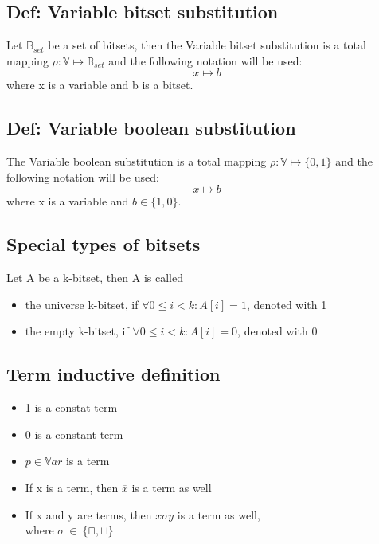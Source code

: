 \documentclass{article}
\begin{document}
	\subsection*{Def: Variable bitset substitution}
		Let $\mathbb{B}_{set}$ be a set of bitsets, then the Variable bitset substitution is a total mapping 
		 $\rho : \mathbb{V} \longmapsto \mathbb{B}_{set}$ and the following notation will be used:
		\begin{equation}
			x \longmapsto b
		\end{equation}
		where x is a variable and b is a bitset.
	\subsection*{Def: Variable boolean substitution}
		The Variable boolean substitution is a total mapping 
		 $\rho : \mathbb{V} \longmapsto \{0, 1\}$ and the following notation will be used:
		\begin{equation}
			x \longmapsto b
		\end{equation}
		where x is a variable and $b \in \{ 1, 0 \}$.
	\subsection*{Special types of bitsets}
		Let A be a k-bitset, then A is called
		\begin{itemize}
			\item the universe k-bitset, if $\forall 0 \leq i<k : A[i] = 1$, denoted with 1
			\item the empty k-bitset, if $\forall 0 \leq i<k : A[i] = 0$, denoted with 0
		\end{itemize}
	\subsection{Term inductive definition}
	\label{sec:term-inductive-definition}
		\begin{itemize}
			\item 1 is a constat term
			\item 0 is a constant term
			\item $p \in \mathbb{V}ar$ is a term
			\item If x is a term, then $\overline{x}$ is a term as well
			\item If x and y are terms, then $x \sigma y $ is a term as well,\\
				where $\sigma \: \in \: \{\sqcap, \sqcup\}$
		\end{itemize}	
\end{document}
